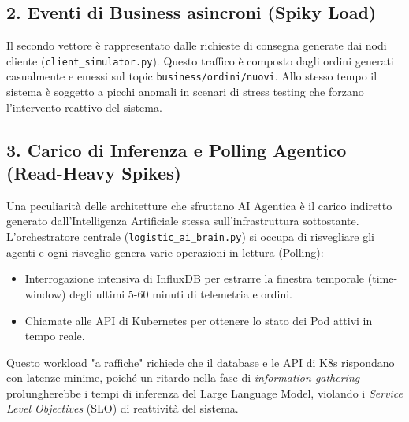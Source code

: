 \subsection*{2. Eventi di Business asincroni (Spiky Load)}
Il secondo vettore è rappresentato dalle richieste di consegna generate dai nodi cliente (\texttt{client\_simulator.py}). Questo traffico è composto dagli ordini generati casualmente e emessi sul topic \texttt{business/ordini/nuovi}. Allo stesso tempo il sistema è soggetto a picchi anomali in scenari di stress testing che forzano l'intervento reattivo del sistema. 

\subsection*{3. Carico di Inferenza e Polling Agentico (Read-Heavy Spikes)}
Una peculiarità delle architetture che sfruttano AI Agentica è il carico indiretto generato dall'Intelligenza Artificiale stessa sull'infrastruttura sottostante. L'orchestratore centrale (\texttt{logistic\_ai\_brain.py}) si occupa di risvegliare gli agenti e ogni risveglio genera varie operazioni in lettura (Polling):
\begin{itemize}
    \item Interrogazione intensiva di InfluxDB per estrarre la finestra temporale (time-window) degli ultimi 5-60 minuti di telemetria e ordini.
    \item Chiamate alle API di Kubernetes per ottenere lo stato dei Pod attivi in tempo reale.
\end{itemize}
Questo workload "a raffiche" richiede che il database e le API di K8s rispondano con latenze minime, poiché un ritardo nella fase di \textit{information gathering} prolungherebbe i tempi di inferenza del Large Language Model, violando i \textit{Service Level Objectives} (SLO) di reattività del sistema. %

